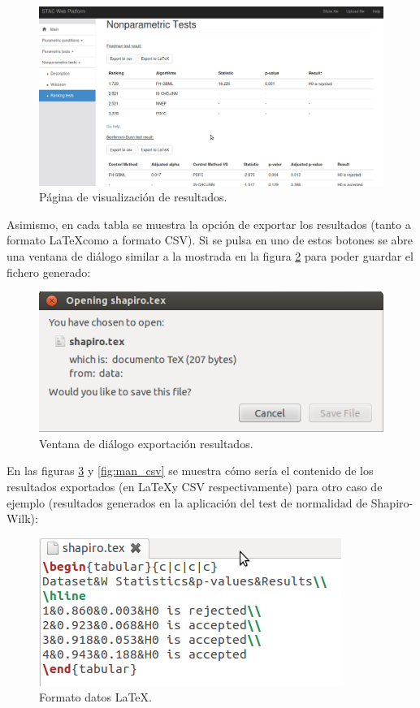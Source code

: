 \begin{figure}[H]
\centering
\includegraphics[scale=0.4]{figuras/man_results.png}
\caption{Página de visualización de resultados.}
\label{fig:man_results}
\end{figure}

Asimismo, en cada tabla se muestra la opción de exportar los resultados (tanto a formato \LaTeX \space como a formato CSV). Si se pulsa en uno de estos botones se abre una ventana de diálogo similar a la mostrada en la figura \ref{fig:man_dialog} para poder guardar el fichero generado:

\begin{figure}[H]
\centering
\includegraphics[scale=0.6]{figuras/man_dialog.png}
\caption{Ventana de diálogo exportación resultados.}
\label{fig:man_dialog}
\end{figure}

En las figuras \ref{fig:man_latex} y \ref{fig:man_csv} se muestra cómo sería el contenido de los resultados exportados (en \LaTeX \space y CSV respectivamente) para otro caso de ejemplo (resultados generados en la aplicación del test de normalidad de Shapiro-Wilk):

\begin{figure}[H]
\centering
\includegraphics[scale=0.6]{figuras/man_latex.png}
\caption{Formato datos \LaTeX.}
\label{fig:man_latex}
\end{figure}

